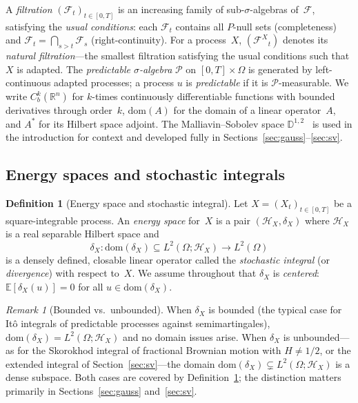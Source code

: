 \documentclass[11pt,a4paper]{article}
\theoremstyle{plain}
\theoremstyle{definition}
\newtheorem{definition}[theorem]{Definition}
\theoremstyle{remark}
\newtheorem{remark}[theorem]{Remark}
\newcommand{\E}{\mathbb{E}}
\newcommand{\R}{\mathbb{R}}
\newcommand{\dom}{\mathrm{dom}}
\newcommand{\HX}{\mathcal{H}_X}
\newcommand{\FX}{\mathcal{F}^X}
\begin{document}
A \emph{filtration} $(\mathcal{F}_t)_{t \in [0,T]}$ is an increasing family of sub-$\sigma$-algebras of~$\mathcal{F}$, satisfying the \emph{usual conditions}: each $\mathcal{F}_t$ contains all $P$-null sets (completeness) and $\mathcal{F}_t = \bigcap_{s>t}\mathcal{F}_s$ (right-continuity). For a process~$X$, $({\FX}_t)$ denotes its \emph{natural filtration}---the smallest filtration satisfying the usual conditions such that $X$ is adapted. The \emph{predictable $\sigma$-algebra} $\mathcal{P}$ on $[0,T] \times \Omega$ is generated by left-continuous adapted processes; a process $u$ is \emph{predictable} if it is $\mathcal{P}$-measurable. We write $C_b^k(\R^n)$ for $k$-times continuously differentiable functions with bounded derivatives through order~$k$, $\dom(A)$ for the domain of a linear operator~$A$, and $A^*$ for its Hilbert space adjoint. The Malliavin--Sobolev space $\mathbb{D}^{1,2}$~\cite{Nualart2006} is used in the introduction for context and developed fully in Sections~\ref{sec:gauss}--\ref{sec:sv}.


\subsection{Energy spaces and stochastic integrals}

\begin{definition}[Energy space and stochastic integral]\label{def:energy}
Let $X = (X_t)_{t \in [0,T]}$ be a square-integrable process. An \emph{energy space} for~$X$ is a pair $(\HX, \delta_X)$ where $\HX$ is a real separable Hilbert space and
\[
\delta_X \colon \dom(\delta_X) \subseteq L^2(\Omega; \HX) \to L^2(\Omega)
\]
is a densely defined, closable linear operator called the \emph{stochastic integral} (or \emph{divergence}) with respect to~$X$. We assume throughout that $\delta_X$ is \emph{centered}: $\E[\delta_X(u)] = 0$ for all $u \in \dom(\delta_X)$.
\end{definition}

\begin{remark}[Bounded vs.\ unbounded]\label{rem:bounded}
When $\delta_X$ is bounded (the typical case for It\^o integrals of predictable processes against semimartingales), $\dom(\delta_X) = L^2(\Omega; \HX)$ and no domain issues arise. When $\delta_X$ is unbounded---as for the Skorokhod integral of fractional Brownian motion with $H \neq 1/2$, or the extended integral of Section~\ref{sec:sv}---the domain $\dom(\delta_X) \subsetneq L^2(\Omega; \HX)$ is a dense subspace. Both cases are covered by Definition~\ref{def:energy}; the distinction matters primarily in Sections~\ref{sec:gauss} and~\ref{sec:sv}.
\end{remark}
\end{document}
